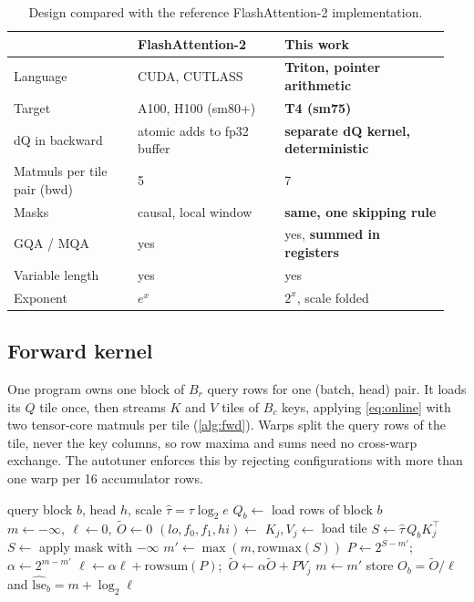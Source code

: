 \documentclass[10pt,twocolumn,letterpaper]{article}
\newcommand{\lse}{\widehat{\mathrm{lse}}}
\begin{document}
\begin{table}[t]
\centering
\footnotesize
\setlength{\tabcolsep}{3pt}
\begin{tabular}{@{}p{0.27\linewidth}p{0.32\linewidth}p{0.36\linewidth}@{}}
\toprule
 & FlashAttention-2~\cite{dao2024flashattention2} & This work \\
\midrule
Language & CUDA, CUTLASS & \textbf{Triton, pointer arithmetic} \\
Target & A100, H100 (sm80+) & \textbf{T4 (sm75)} \\
dQ in backward & atomic adds to fp32 buffer & \textbf{separate dQ kernel, deterministic} \\
Matmuls per tile pair (bwd) & 5 & 7 \\
Masks & causal, local window & \textbf{same, one skipping rule} \\
GQA / MQA & yes & yes, \textbf{summed in registers} \\
Variable length & yes & yes \\
Exponent & $e^x$ & $2^x$, scale folded \\
\bottomrule
\end{tabular}
\caption{Design compared with the reference FlashAttention-2 implementation.}
\label{tab:compare}
\end{table}

\subsection{Forward kernel}
One program owns one block of $B_r$ query rows for one (batch, head) pair. It
loads its $Q$ tile once, then streams $K$ and $V$ tiles of $B_c$ keys,
applying \cref{eq:online} with two tensor-core matmuls per tile
(\cref{alg:fwd}). Warps split the query rows of the tile, never the key
columns, so row maxima and sums need no cross-warp exchange. The autotuner
enforces this by rejecting configurations with more than one warp per 16
accumulator rows.

\begin{algorithm}[t]
\caption{Forward kernel, one program}
\label{alg:fwd}
\begin{algorithmic}[1]
\Require query block $b$, head $h$, scale $\hat\tau = \tau \log_2 e$
\State $Q_b \gets$ load rows of block $b$ 
\State $m \gets -\infty,\ \ell \gets 0,\ \tilde{O} \gets 0$
\State $(lo, f_0, f_1, hi) \gets$ 
\For{key tile $j$ in $[lo, hi)$}
  \State $K_j, V_j \gets$ load tile 
  \State $S \gets \hat\tau\, Q_b K_j^\top$
  \If{$j \notin [f_0, f_1)$} $S \gets$ apply mask with $-\infty$ \EndIf
  \State $m' \gets \max(m, \mathrm{rowmax}(S))$
  \State $P \gets 2^{S - m'}$;\ $\alpha \gets 2^{m - m'}$
  \State $\ell \gets \alpha \ell + \mathrm{rowsum}(P)$;\ $\tilde{O} \gets \alpha \tilde{O} + P V_j$
  \State $m \gets m'$
\EndFor
\State store $O_b = \tilde{O} / \ell$ and $\lse_b = m + \log_2 \ell$
\end{algorithmic}
\end{algorithm}
\end{document}
